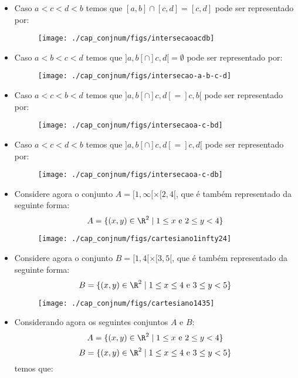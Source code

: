\begin{itemize}
  \item Caso $a< c< d< b$ temos que $[a, b] \cap [c, d]= [c, d]$ pode ser representado por:
  \begin{figure}[H]
 \centering
 \texttt{[image: ./cap\_conjnum/figs/intersecaoacdb]}
 \end{figure}

 \item Caso $a< b< c< d$ temos que $]a, b[ \cap ]c, d[ = \emptyset$ pode ser representado por:
  \begin{figure}[H]
 \centering
 \texttt{[image: ./cap\_conjnum/figs/intersecao-a-b-c-d]}
 \end{figure}

 \item Caso $a< c< b< d$ temos que $]a, b[ \cap ]c, d[= ]c, b[$ pode ser representado por:
  \begin{figure}[H]
 \centering
 \texttt{[image: ./cap\_conjnum/figs/intersecaoa-c-bd]}
 \end{figure}

   \item Caso $a< c< d< b$ temos que $]a, b[ \cap ]c, d[= ]c, d[$ pode ser representado por:
  \begin{figure}[H]
 \centering
 \texttt{[image: ./cap\_conjnum/figs/intersecaoa-c-db]}
 \end{figure}

 \item Considere agora o conjunto $A= [1, \infty[ \times [2, 4[$, que é também representado da seguinte forma:
\begin{equation}
A= \{(x, y) \in \R^2 \mid 1 \leq x \text{ e } 2 \leq y < 4 \}
\end{equation}
   \begin{figure}[H]
 \centering
 \texttt{[image: ./cap\_conjnum/figs/cartesiano1infty24]}
 \end{figure}

 \item Considere agora o conjunto $B= [1, 4[ \times [3, 5[$, que é também representado da seguinte forma:
\begin{equation}
B= \{(x, y) \in \R^2 \mid 1 \leq x \leq 4 \text{ e } 3 \leq y < 5 \}
\end{equation}
   \begin{figure}[H]
 \centering
 \texttt{[image: ./cap\_conjnum/figs/cartesiano1435]}
 \end{figure}

 \item Considerando agora os seguintes conjuntos $A$ e $B$:
\begin{equation}
A= \{(x, y) \in \R^2 \mid 1 \leq x \text{ e } 2 \leq y < 4 \}
\end{equation}
\begin{equation}
B= \{(x, y) \in \R^2 \mid 1 \leq x \leq 4 \text{ e } 3 \leq y < 5 \}
\end{equation}
 temos que:


\end{itemize}
